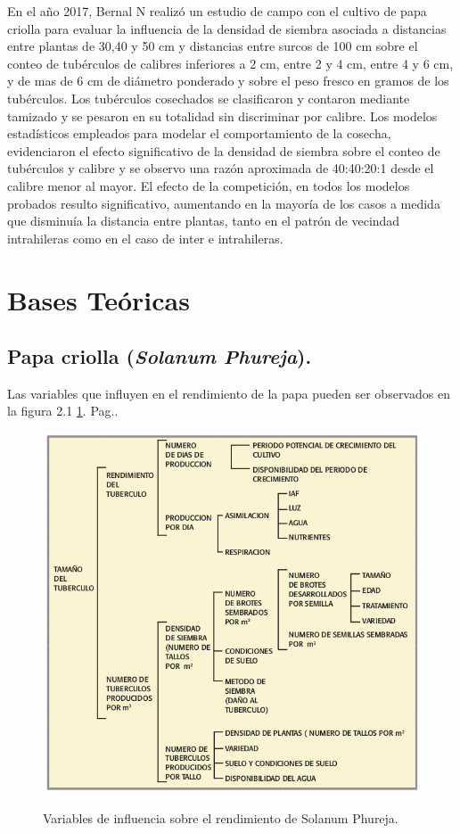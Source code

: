 En el año 2017, Bernal N realizó un estudio de campo con el cultivo de papa criolla para evaluar la influencia de la densidad de siembra asociada a distancias entre plantas de 30,40 y 50 cm y distancias entre surcos de 100 cm sobre el conteo de tubérculos de calibres inferiores a 2 cm, entre 2 y 4 cm, entre 4 y 6 cm, y de mas de 6 cm de diámetro ponderado y sobre el peso fresco en gramos de los tubérculos. Los tubérculos cosechados se clasificaron y contaron mediante tamizado y se pesaron en su totalidad sin discriminar por calibre. Los modelos estadísticos empleados para modelar el comportamiento de la cosecha, evidenciaron el efecto significativo de la densidad de siembra sobre el conteo de tubérculos y calibre y se observo una razón aproximada de 40:40:20:1 desde el calibre menor al mayor. El efecto de la competición, en todos los modelos probados resulto significativo, aumentando en la mayoría de los casos a medida que disminuía la distancia entre plantas, tanto en el patrón de vecindad intrahileras como en el caso de inter e intrahileras.

\section{Bases Te\'oricas}

\subsection{Papa criolla (\textit{Solanum Phureja}).}

Las variables que influyen en el rendimiento de la papa pueden ser observados en la figura 2.1 \ref{fig:arch}. Pag.\pageref{fig:arch}.\\
\begin{figure}[h]
	\caption{Variables de influencia sobre el rendimiento de Solanum Phureja.}
	\centering
	\includegraphics[scale=0.5]{variables.png}
	\label{fig:arch}
\end{figure}

